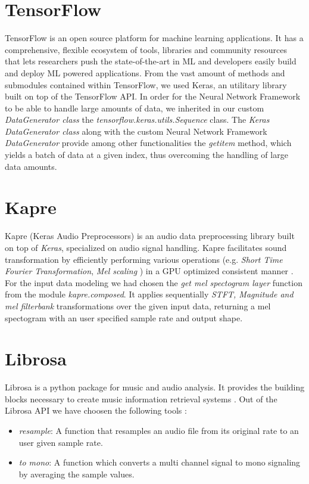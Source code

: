 \section{TensorFlow}
TensorFlow is an open source platform for machine learning applications. It has a comprehensive, flexible ecosystem of tools, libraries and community resources that lets researchers push the state-of-the-art in ML and developers easily build and deploy ML powered applications.\cite{tf}
From the vast amount of methods and submodules contained within TensorFlow, we used Keras, an utilitary library
built on top of the TensorFlow API. In order for the Neural Network Framework to be able to handle large amounts
of data, we inherited in our custom \textit{DataGenerator class} the \textit{tensorflow.keras.utils.Sequence}
class. The \textit{Keras DataGenerator class} along with the custom Neural Network Framework \textit{DataGenerator}
provide among other functionalities the \textit{getitem} method, which yields a batch of data at a given index, thus overcoming the handling of large data amounts.

\section{Kapre}
Kapre (Keras Audio Preprocessors) is an audio data preprocessing library built on top of \textit{Keras},
specialized on audio signal handling.\cite{choi2017kapre}
Kapre facilitates sound transformation by efficiently performing various operations (e.g. \textit{Short
Time Fourier Transformation}, \textit{Mel scaling} ) in a GPU optimized consistent manner . For the input data modeling we had chosen the
\textit{get mel spectogram layer} function from the module \textit{kapre.composed}. It applies sequentially
\textit{STFT, Magnitude and mel filterbank} transformations over the given input data, returning a mel spectogram
with an user specified sample rate and output shape.
\section{Librosa}
Librosa is a python package for music and audio analysis. It provides the building blocks necessary to create music information retrieval systems \cite{mcfee2015librosa}.
Out of the Librosa API we have choosen the following tools :
\begin{itemize}
	\item \textit{resample}: A function that resamples an audio file from its original rate to an user
		given sample rate.

	\item \textit{to mono}: A function which converts a multi channel signal to mono signaling by averaging
		the sample values.
\end{itemize}
